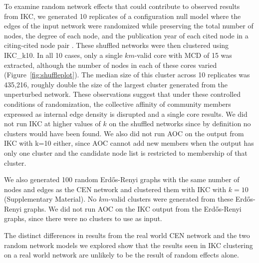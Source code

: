 \documentclass[12pt, oneside]{article}   	%
\begin{document}
	
To examine random network effects that could contribute to observed results from IKC, we generated 10 replicates of a configuration null model where the edges of the input network were randomized while preserving the total number of nodes, the degree of each node,  and the publication year of each cited node in a citing-cited node pair \citep{bradley2020,uzzi2013}. These shuffled networks were then clustered using IKC\_k10. In all 10 cases, only a single $km$-valid core with MCD of 15 was extracted, although the number of nodes in each of these cores varied (Figure~\ref{fig:shuffleplot}).
 The median size of this cluster across 10 replicates was 435,216, roughly double the size of the largest cluster generated from the unperturbed network. These observations suggest that under these controlled conditions of randomization, the collective affinity of community members expressed as internal edge density is disrupted and a single core results. 
 We did not run IKC at higher values of $k$ on the shuffled networks since  by definition no clusters would have been found.
 We also did not run AOC on the output from IKC with  k=10 either,  since AOC cannot add new members when the output has only one cluster and the candidate node list is restricted to membership of that cluster.

We also generated 100 random Erd\H{o}s-Renyi graphs with the same number of nodes and edges as the CEN network and clustered them with IKC with $k=10$ (Supplementary Material). No $km$-valid clusters were generated from these Erd\H{o}s-Renyi graphs. 
We did not run AOC on the IKC output from  the Erd\H{o}s-Renyi graphs, since there were no clusters to use as input. 
	
The distinct differences in results from the real world CEN network and the two random network models we explored show that the results seen in IKC clustering on a real world network are unlikely to be the result of random effects alone. 
	
	
	
\end{document}
